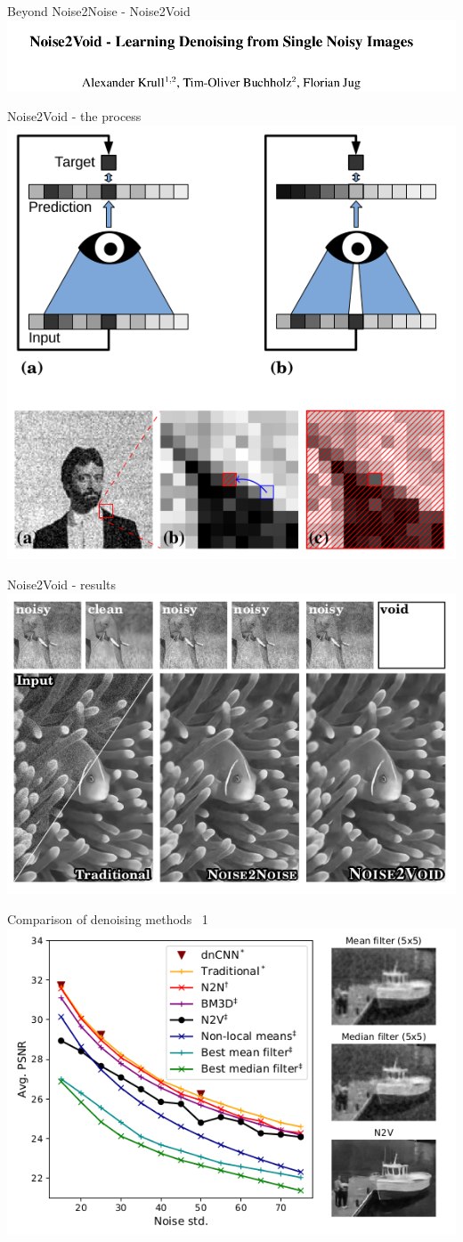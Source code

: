 \documentclass[9pt, aspectratio=169]{beamer}
\begin{document}
\begin{frame}
    {Beyond Noise2Noise - Noise2Void}
    \includegraphics[width=\textwidth]{Noise2Void_title.png}
\end{frame}

\begin{frame}
    {Noise2Void - the process}
    \centering
    \includegraphics[width=.5\textwidth]{Noise2Void_process.png}
\end{frame}
\begin{frame}
    {Noise2Void - results}
    \centering
    \includegraphics[width=.8\textwidth]{Noise2Void_result.png}
\end{frame}

\begin{frame}
    {Comparison of denoising methods}
    \centering\ 1
    \includegraphics[width=.7\textwidth]{denoising comparison.png}
\end{frame}
\end{document}
